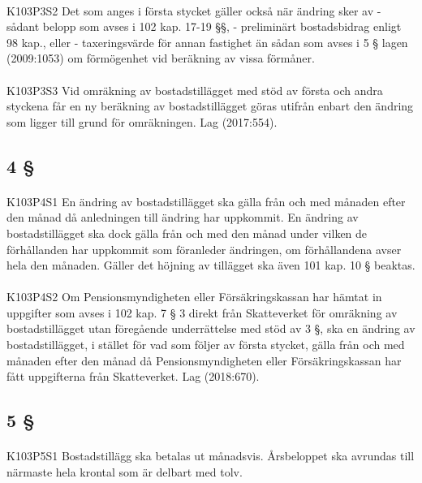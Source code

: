 \documentclass[a4paper,notitlepage,openany,10pt]{book}
\begin{document}
\paragraph*{}
{\tiny K103P3S2}
Det som anges i första stycket gäller också när ändring sker av
\newline - sådant belopp som avses i 102 kap. 17-19 §§,
\newline - preliminärt bostadsbidrag enligt 98 kap., eller
\newline - taxeringsvärde för annan fastighet än sådan som avses i 5 § lagen (2009:1053) om förmögenhet vid beräkning av vissa förmåner.
\paragraph*{}
{\tiny K103P3S3}
Vid omräkning av bostadstillägget med stöd av första och andra styckena får en ny beräkning av bostadstillägget göras utifrån enbart den ändring som ligger till grund för omräkningen.
Lag (2017:554).
\subsection*{4 §}
\paragraph*{}
{\tiny K103P4S1}
En ändring av bostadstillägget ska gälla från och med månaden efter den månad då anledningen till ändring har uppkommit. En ändring av bostadstillägget ska dock gälla från och med den månad under vilken de förhållanden har uppkommit som föranleder ändringen, om förhållandena avser hela den månaden. Gäller det höjning av tillägget ska även 101 kap. 10 § beaktas.
\paragraph*{}
{\tiny K103P4S2}
Om Pensionsmyndigheten eller Försäkringskassan har hämtat in uppgifter som avses i 102 kap. 7 § 3 direkt från Skatteverket för omräkning av bostadstillägget utan föregående underrättelse med stöd av 3 §, ska en ändring av bostadstillägget, i stället för vad som följer av första stycket, gälla från och med månaden efter den månad då Pensionsmyndigheten eller Försäkringskassan har fått uppgifterna från Skatteverket.
Lag (2018:670).
\subsection*{5 §}
\paragraph*{}
{\tiny K103P5S1}
Bostadstillägg ska betalas ut månadsvis. Årsbeloppet ska avrundas till närmaste hela krontal som är delbart med tolv.
\end{document}
